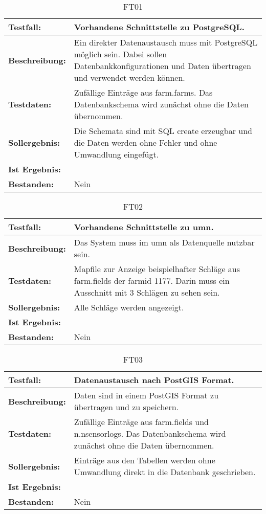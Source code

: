 \label{appendix:funktionstests} 
\capstartfalse
\begin{table}[h!]
\centering
\small
\begin{tabular}{p{2.8cm}|p{12cm}}
\textbf{Testfall:} & Vorhandene Schnittstelle zu PostgreSQL. \\ \hline
\textbf{Beschreibung:} & Ein direkter Datenaustausch muss mit PostgreSQL möglich sein. Dabei sollen Datenbankkonfigurationen und Daten übertragen und verwendet werden können. \\ \hline
\textbf{Testdaten:} & Zufällige Einträge aus farm.farms. Das Datenbankschema wird zunächst ohne die Daten übernommen. \\ \hline
\textbf{Sollergebnis:} & Die Schemata sind mit SQL create erzeugbar und die Daten werden ohne Fehler und ohne Umwandlung eingefügt. \\ \hline
\textbf{Ist Ergebnis:} &  \\ \hline
\textbf{Bestanden:} & Nein \\
\end{tabular}
\caption*{FT01}
\end{table}

\begin{table}[h!]
\centering
\small
\begin{tabular}{p{2.8cm}|p{12cm}}
\textbf{Testfall:} & Vorhandene Schnittstelle zu \Gls{umn}. \\ \hline
\textbf{Beschreibung:} & Das System muss im \Gls{umn} als Datenquelle nutzbar sein. \\ \hline
\textbf{Testdaten:} & Mapfile zur Anzeige beispielhafter Schläge aus farm.fields der farmid 1177. Darin muss ein Ausschnitt mit 3 Schlägen zu sehen sein. \\ \hline
\textbf{Sollergebnis:} & Alle Schläge werden angezeigt. \\ \hline
\textbf{Ist Ergebnis:} &  \\ \hline
\textbf{Bestanden:} & Nein \\
\end{tabular}
\caption*{FT02}
\end{table}

\begin{table}[h!]
\centering
\small
\begin{tabular}{p{2.8cm}|p{12cm}}
\textbf{Testfall:} & Datenaustausch nach PostGIS Format. \\ \hline
\textbf{Beschreibung:} & Daten sind in einem PostGIS Format zu übertragen und zu speichern. \\ \hline
\textbf{Testdaten:} & Zufällige Einträge aus farm.fields und n.nsensorlogs. Das Datenbankschema wird zunächst ohne die Daten übernommen. \\ \hline
\textbf{Sollergebnis:} & Einträge aus den Tabellen werden ohne Umwandlung direkt in die Datenbank geschrieben. \\ \hline
\textbf{Ist Ergebnis:} &  \\ \hline
\textbf{Bestanden:} & Nein \\
\end{tabular}
\caption*{FT03}
\end{table}

